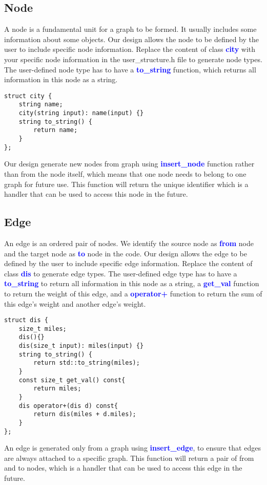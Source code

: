 \documentclass[]{article}
\begin{document}
\subsection{Node}
A node is a fundamental unit for a graph to be formed. It usually includes some information about some objects. Our design allows the node to be defined by the user to include specific node information. Replace the content of class \textbf{\textcolor{blue}{city}} with your specific node information in the user{\_}structure.h file to generate node types. The user-defined node type has to have a \textbf{\textcolor{blue}{to\_string}} function, which returns all information in this node as a string.\\
\begin{lstlisting}
struct city {
    string name;
    city(string input): name(input) {} 
    string to_string() {
        return name;
    }
};
\end{lstlisting}
Our design generate new nodes from graph using \textbf{\textcolor{blue}{insert\_node}} function rather than from the node itself, which means that one node needs to belong to one graph for future use. This function will return the unique identifier which is a handler that can be used to access this node in the future.

\subsection{Edge}
An edge is an ordered pair of nodes. We identify the source node as \textbf{\textcolor{blue}{from}} node and the target node as \textbf{\textcolor{blue}{to}} node in the code. Our design allows the edge to be defined by the user to include specific edge information. Replace the content of class \textbf{\textcolor{blue}{dis}} to generate edge types. The user-defined edge type has to have a \textbf{\textcolor{blue}{to\_string}} to return all information in this node as a string, a \textbf{\textcolor{blue}{get\_val}} function to return the weight of this edge, and a \textbf{\textcolor{blue}{operator+}} function to return the sum of this edge's weight and another edge's weight.\\
\begin{lstlisting}
struct dis {
    size_t miles;
    dis(){}
    dis(size_t input): miles(input) {}
    string to_string() {
        return std::to_string(miles);
    }
    const size_t get_val() const{
        return miles;
    }
    dis operator+(dis d) const{
        return dis(miles + d.miles);
    }
};
\end{lstlisting}
An edge is generated only from a graph using \textbf{\textcolor{blue}{insert\_edge}}, to ensure that edges are always attached to a specific graph. This function will return a pair of from and to nodes, which is a handler that can be used to access this edge in the future.
\end{document}
